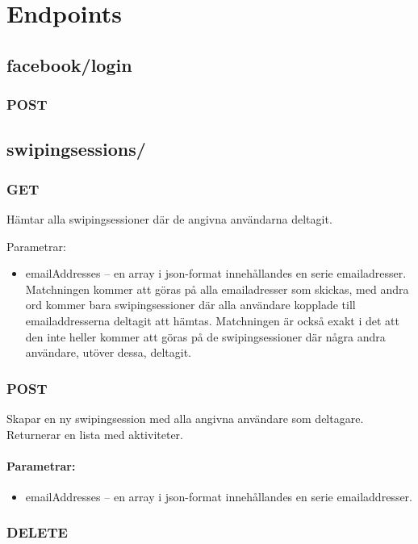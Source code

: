 \documentclass{article}
\begin{document}
	\section*{Endpoints}

	\subsection*{facebook/login}

		\subsubsection*{POST}

	\subsection*{swipingsessions/}

		\subsubsection*{GET}

		Hämtar alla swipingsessioner där de angivna användarna deltagit.

		Parametrar:
	
		\begin{itemize}
			
			\item emailAddresses -- en array i json-format innehållandes en serie emailadresser. Matchningen kommer att göras på alla
				emailadresser som skickas, med andra ord kommer bara swipingsessioner där alla användare kopplade till emailaddresserna
				deltagit att hämtas. Matchningen är också exakt i det att den inte heller kommer att göras på de swipingsessioner där
				några andra användare, utöver dessa, deltagit.

		\end{itemize}

		\subsubsection*{POST}

		Skapar en ny swipingsession med alla angivna användare som deltagare. Returnerar en lista med aktiviteter.

		\paragraph{Parametrar:}

		\begin{itemize}		

			\item emailAddresses -- en array i json-format innehållandes en serie emailaddresser.			

		\end{itemize}		

		\subsubsection*{DELETE}
\end{document}
